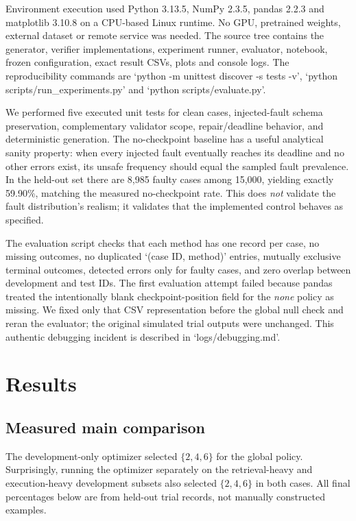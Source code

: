 \documentclass[conference]{IEEEtran}
\begin{document}
Environment execution used Python 3.13.5, NumPy 2.3.5, pandas 2.2.3 and matplotlib 3.10.8 on a CPU-based Linux runtime. No GPU, pretrained weights, external dataset or remote service was needed. The source tree contains the generator, verifier implementations, experiment runner, evaluator, notebook, frozen configuration, exact result CSVs, plots and console logs. The reproducibility commands are `python -m unittest discover -s tests -v', `python scripts/run\_experiments.py' and `python scripts/evaluate.py'.

We performed five executed unit tests for clean cases, injected-fault schema preservation, complementary validator scope, repair/deadline behavior, and deterministic generation. The no-checkpoint baseline has a useful analytical sanity property: when every injected fault eventually reaches its deadline and no other errors exist, its unsafe frequency should equal the sampled fault prevalence. In the held-out set there are 8,985 faulty cases among 15,000, yielding exactly 59.90\%, matching the measured no-checkpoint rate. This does \emph{not} validate the fault distribution's realism; it validates that the implemented control behaves as specified.

The evaluation script checks that each method has one record per case, no missing outcomes, no duplicated `(case ID, method)' entries, mutually exclusive terminal outcomes, detected errors only for faulty cases, and zero overlap between development and test IDs. The first evaluation attempt failed because pandas treated the intentionally blank checkpoint-position field for the \emph{none} policy as missing. We fixed only that CSV representation before the global null check and reran the evaluator; the original simulated trial outputs were unchanged. This authentic debugging incident is described in `logs/debugging.md'.

\section{Results}
\subsection{Measured main comparison}
The development-only optimizer selected $\{2,4,6\}$ for the global policy. Surprisingly, running the optimizer separately on the retrieval-heavy and execution-heavy development subsets also selected $\{2,4,6\}$ in both cases. All final percentages below are from held-out trial records, not manually constructed examples.
\end{document}
